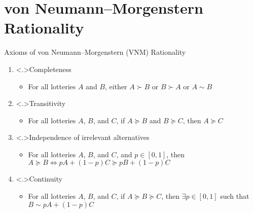 \documentclass[11pt,aspectratio=169,handout]{beamer}
\begin{document}
  \section{von Neumann–Morgenstern Rationality}
  \begin{frame}{Axioms of von Neumann–Morgenstern (VNM) Rationality}
   \begin{enumerate}[<+->]
    \setlength{\itemsep}{1em}
    \item \alert<.>{Completeness}
    \begin{itemize}[<.->]
     \item For all lotteries $A$ and $B$, either $A \succ B$ or $B \succ A$ or $A\sim B$
    \end{itemize}
    \item \alert<.>{Transitivity}
    \begin{itemize}[<.->]
     \item For all lotteries $A$, $B$, and $C$, if $A \succeq B$ and $B \succeq C$, then $A \succeq C$
    \end{itemize}
    \item \alert<.>{Independence of irrelevant alternatives}
    \begin{itemize}[<.->]
     \item For all lotteries $A$, $B$, and $C$, and $p\in [0,1]$, then $A\succeq B \Longleftrightarrow pA + (1-p)C \succeq pB + (1-p)C$
    \end{itemize}
    \item \alert<.>{Continuity}
    \begin{itemize}[<.->]
     \item For all lotteries $A$, $B$, and $C$, if $A \succeq B \succeq C$, then $ \exists p \in [0,1]$ such that $B \sim pA + (1-p)C$
    \end{itemize}
   \end{enumerate}   
  \end{frame}
  
\end{document}
